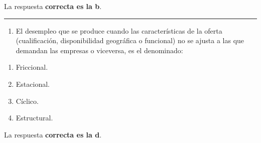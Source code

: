 \documentclass[
  letterpaper,
  DIV=11,
  numbers=noendperiod]{scrreprt}
\providecommand{\tightlist}{%
  \setlength{\itemsep}{0pt}\setlength{\parskip}{0pt}}\usepackage{longtable,booktabs,array}
\begin{document}
\begin{tcolorbox}[enhanced jigsaw, left=2mm, opacityback=0, colback=white, breakable, arc=.35mm, bottomrule=.15mm, rightrule=.15mm, toprule=.15mm, leftrule=.75mm, colframe=quarto-callout-tip-color-frame]
\begin{minipage}[t]{5.5mm}
\textcolor{quarto-callout-tip-color}{\faLightbulb}
\end{minipage}%
\begin{minipage}[t]{\textwidth - 5.5mm}

La respuesta \textbf{correcta es la b}.

\end{minipage}%
\end{tcolorbox}

\begin{center}\rule{0.5\linewidth}{0.5pt}\end{center}

\begin{enumerate}
\def\labelenumi{\arabic{enumi}.}
\setcounter{enumi}{52}
\tightlist
\item
  El desempleo que se produce cuando las características de la oferta
  (cualificación, disponibilidad geográfica o funcional) no se ajusta a
  las que demandan las empresas o viceversa, es el denominado:
\end{enumerate}

\begin{enumerate}
\def\labelenumi{\alph{enumi}.}
\item
  Friccional.
\item
  Estacional.
\item
  Cíclico.
\item
  Estructural.
\end{enumerate}

\begin{tcolorbox}[enhanced jigsaw, left=2mm, opacityback=0, colback=white, breakable, arc=.35mm, bottomrule=.15mm, rightrule=.15mm, toprule=.15mm, leftrule=.75mm, colframe=quarto-callout-tip-color-frame]
\begin{minipage}[t]{5.5mm}
\textcolor{quarto-callout-tip-color}{\faLightbulb}
\end{minipage}%
\begin{minipage}[t]{\textwidth - 5.5mm}

La respuesta \textbf{correcta es la d}.

\end{minipage}%
\end{tcolorbox}
\end{document}
